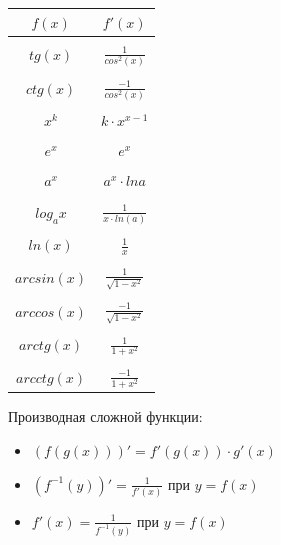 \documentclass[oneside]{book}
\begin{document}
\begin{enumerate}
\begin{center}
      \begin{tabular}{c|c}
        $f(x)$ & $f'(x)$ \\
        \hline \\
        $tg(x)$ & $\frac{1}{cos^2(x)}$ \\
          \hline \\
        $ctg(x)$ & $\frac{-1}{cos^2(x)}$ \\
          \hline \\
        $x^k$ & $k \cdot x^{x-1}$ \\
          \hline \\
        $e^x$ & $e^x$ \\
          \hline \\
       $a^x$ & $a^x \cdot ln a$ \\
          \hline \\ 
	 $log_a x$ & $\frac{1}{x \cdot ln(a)}$ \\
          \hline \\
        $ln(x)$ & $\frac{1}{x}$ \\
          \hline \\
        $arcsin(x)$ & $\frac{1}{\sqrt{1 - x^2}}$ \\
          \hline \\
        $arccos(x)$ & $\frac{-1}{\sqrt{1 - x^2}}$ \\
          \hline \\
        $arctg(x)$ & $\frac{1}{1 + x^2}$ \\
          \hline \\
        $arcctg(x)$ & $\frac{-1}{1 + x^2}$ \\
      \end{tabular}
  \end{center}
Производная сложной функции:
\begin{itemize}
  \item $(f(g(x)))' = f'(g(x)) \cdot g'(x)$
  \item $(f^{-1}(y))' = \frac{1}{f'(x)}$ при $y = f(x)$
  \item $f'(x) = \frac{1}{f^{-1}(y)}$ при $y = f(x)$
\end{itemize}

\setcounter{chapter}{17}


\end{enumerate}
\end{document}
